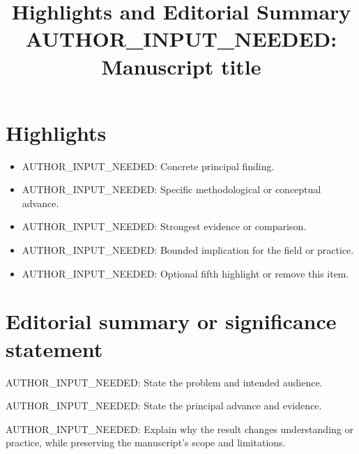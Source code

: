 \documentclass[11pt]{article}
\title{Highlights and Editorial Summary\\
\large AUTHOR\_INPUT\_NEEDED: Manuscript title}
\author{}
\date{}
\begin{document}
\maketitle

\section*{Highlights}

\begin{itemize}[leftmargin=*]
  \item AUTHOR\_INPUT\_NEEDED: Concrete principal finding.
  \item AUTHOR\_INPUT\_NEEDED: Specific methodological or conceptual advance.
  \item AUTHOR\_INPUT\_NEEDED: Strongest evidence or comparison.
  \item AUTHOR\_INPUT\_NEEDED: Bounded implication for the field or practice.
  \item AUTHOR\_INPUT\_NEEDED: Optional fifth highlight or remove this item.
\end{itemize}

\section*{Editorial summary or significance statement}

AUTHOR\_INPUT\_NEEDED: State the problem and intended audience.

AUTHOR\_INPUT\_NEEDED: State the principal advance and evidence.

AUTHOR\_INPUT\_NEEDED: Explain why the result changes understanding or practice,
while preserving the manuscript's scope and limitations.
\end{document}
